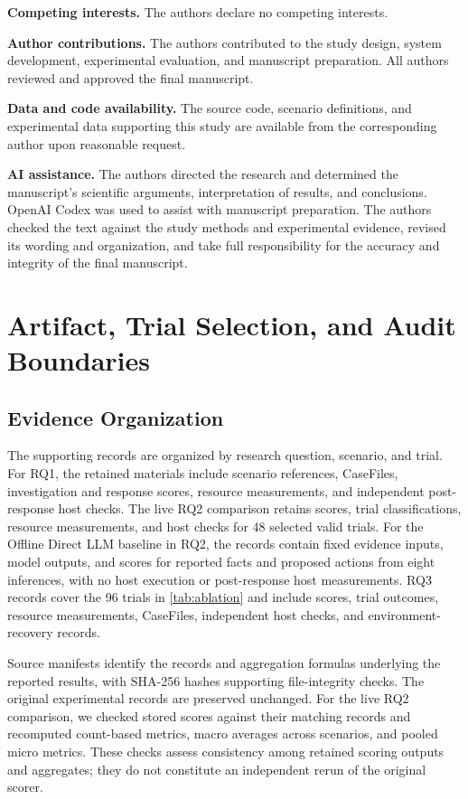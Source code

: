 \documentclass[pdflatex,sn-basic]{sn-jnl}
\begin{document}
\medskip
\noindent\textbf{Competing interests.}
The authors declare no competing interests.

\medskip
\noindent\textbf{Author contributions.}
The authors contributed to the study design, system development, experimental evaluation, and manuscript preparation. All authors reviewed and approved the final manuscript.

\medskip
\noindent\textbf{Data and code availability.}
The source code, scenario definitions, and experimental data supporting this study are available from the corresponding author upon reasonable request.

\medskip
\noindent\textbf{AI assistance.}
The authors directed the research and determined the manuscript's scientific arguments, interpretation of results, and conclusions. OpenAI Codex was used to assist with manuscript preparation. The authors checked the text against the study methods and experimental evidence, revised its wording and organization, and take full responsibility for the accuracy and integrity of the final manuscript.

\appendix
\section{Artifact, Trial Selection, and Audit Boundaries}
\label{sec:artifact}

\subsection{Evidence Organization}

The supporting records are organized by research question, scenario, and trial. For RQ1, the retained materials include scenario references, CaseFiles, investigation and response scores, resource measurements, and independent post-response host checks. The live RQ2 comparison retains scores, trial classifications, resource measurements, and host checks for 48 selected valid trials. For the Offline Direct LLM baseline in RQ2, the records contain fixed evidence inputs, model outputs, and scores for reported facts and proposed actions from eight inferences, with no host execution or post-response host measurements. RQ3 records cover the 96 trials in \autoref{tab:ablation} and include scores, trial outcomes, resource measurements, CaseFiles, independent host checks, and environment-recovery records.

Source manifests identify the records and aggregation formulas underlying the reported results, with SHA-256 hashes supporting file-integrity checks. The original experimental records are preserved unchanged. For the live RQ2 comparison, we checked stored scores against their matching records and recomputed count-based metrics, macro averages across scenarios, and pooled micro metrics. These checks assess consistency among retained scoring outputs and aggregates; they do not constitute an independent rerun of the original scorer.
\end{document}
